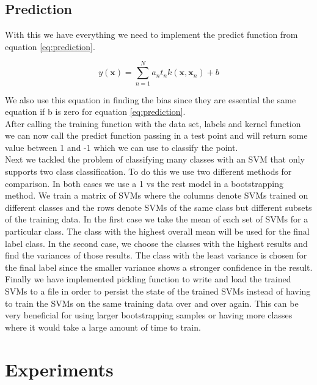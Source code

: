 \documentclass[journal]{IEEEtran}
\begin{document}
    \subsection{Prediction}
    With this we have everything we need to implement the predict function from equation \ref{eq:prediction}.

    \begin{equation}
    \label{eq:prediction}
    y(\mathbf{x}) = \sum\limits_{n = 1}^N a_n t_n k(\mathbf{x}, \mathbf{x}_n) + b
    \end{equation}

    We also use this equation in finding the bias since they are essential the same equation if b is zero for equation \ref{eq:prediction}.\\

    After calling the training function with the data set, labels and kernel function we can now call the predict function passing in a test point and will return some value between 1 and -1 which we can use to classify the point.\\

    Next we tackled the problem of classifying many classes with an SVM that only supports two class classification. To do this we use two different methods for comparison. In both cases we use a 1 vs the rest model in a bootstrapping method. We train a matrix of SVMs where the columns denote SVMs trained on different classes and the rows denote SVMs of the same class but different subsets of the training data. In the first case we take the mean of each set of SVMs for a particular class. The class with the highest overall mean will be used for the final label class. In the second case, we choose the classes with the highest results and find the variances of those results. The class with the least variance is chosen for the final label since the smaller variance shows a stronger confidence in the result.\\

    Finally we have implemented pickling function to write and load the trained SVMs to a file in order to persist the state of the trained SVMs instead of having to train the SVMs on the same training data over and over again. This can be very beneficial for using larger bootstrapping samples or having more classes where it would take a large amount of time to train.\\




\section{Experiments}
\end{document}
